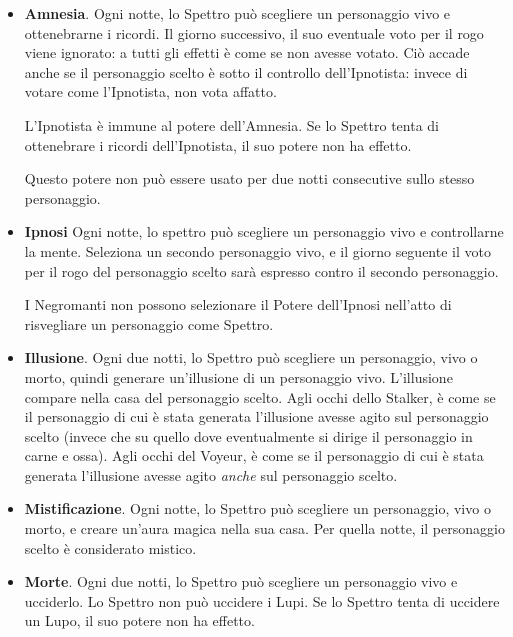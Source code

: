 \documentclass[a4paper,10pt]{article}
\begin{document}
\begin{itemize}
 \item {\bf Amnesia}. Ogni notte, lo Spettro può scegliere un personaggio vivo e
ottenebrarne i ricordi. Il giorno successivo, il suo eventuale voto per il rogo
viene ignorato: a tutti gli effetti è come se non avesse votato. Ciò accade
anche se il personaggio scelto è sotto il controllo dell'Ipnotista: invece di
votare come l'Ipnotista, non vota affatto.
 
 L'Ipnotista è immune al potere dell'Amnesia. Se lo Spettro tenta di ottenebrare
i ricordi dell'Ipnotista, il suo potere non ha effetto.
 
 Questo potere non può essere usato per due notti consecutive sullo stesso
personaggio.

\item{\bf Ipnosi} Ogni notte, lo spettro può scegliere un personaggio vivo e
controllarne la mente. Seleziona un secondo personaggio vivo, e il giorno seguente
il voto per il rogo del personaggio scelto sarà espresso contro il secondo personaggio.

I Negromanti non possono selezionare il Potere dell'Ipnosi nell'atto di risvegliare un
personaggio come Spettro.



 \item {\bf Illusione}. Ogni due notti, lo Spettro può scegliere un personaggio,
vivo o morto, quindi generare un'illusione di un personaggio vivo. L'illusione compare
nella casa del personaggio scelto.
 Agli occhi dello Stalker, è come se il personaggio di cui è stata
generata l'illusione avesse agito sul personaggio scelto (invece che su quello dove
eventualmente si dirige il personaggio in carne e ossa).
 Agli occhi del Voyeur, è come se il personaggio di cui è stata
generata l'illusione avesse agito \emph{anche} sul personaggio scelto.

 \item {\bf Mistificazione}. Ogni notte, lo Spettro può scegliere un personaggio,
vivo o morto, e creare un'aura magica nella sua casa. Per quella notte, il
personaggio scelto è considerato mistico. 
 
 \item {\bf Morte}. Ogni due notti, lo Spettro può scegliere un personaggio vivo
e ucciderlo.
 Lo Spettro non può uccidere i Lupi. Se lo Spettro tenta di uccidere un Lupo,
il suo potere non ha effetto.
 

\end{itemize}
\end{document}
